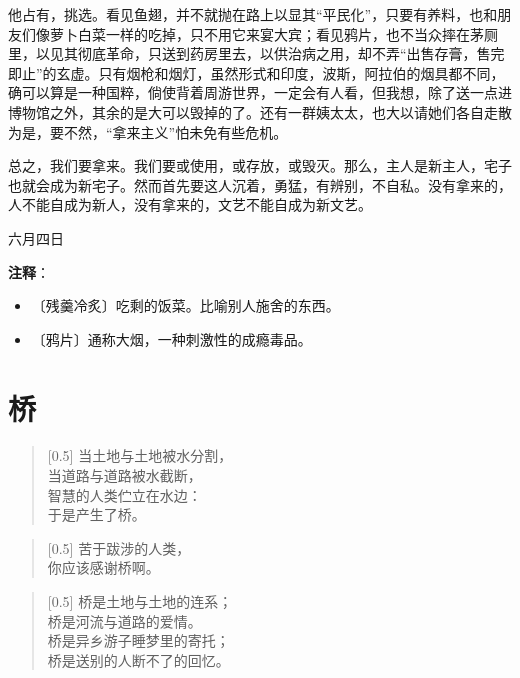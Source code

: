 \documentclass[12pt,UTF-8,openany]{ctexbook}
\begin{document}
\begin{normalsize}
    他占有，挑选。看见鱼翅，并不就抛在路上以显其“平民化”，只要有养料，也和朋友们像萝卜白菜一样的吃掉，只不用它来宴大宾；看见鸦片，也不当众摔在茅厕里，以见其彻底革命，只送到药房里去，以供治病之用，却不弄“出售存膏，售完即止”的玄虚。只有烟枪和烟灯，虽然形式和印度，波斯，阿拉伯的烟具都不同，确可以算是一种国粹，倘使背着周游世界，一定会有人看，但我想，除了送一点进博物馆之外，其余的是大可以毁掉的了。还有一群姨太太，也大以请她们各自走散为是，要不然，“拿来主义”怕未免有些危机。
    
    总之，我们要拿来。我们要或使用，或存放，或毁灭。那么，主人是新主人，宅子也就会成为新宅子。然而首先要这人沉着，勇猛，有辨别，不自私。没有拿来的，人不能自成为新人，没有拿来的，文艺不能自成为新文艺。
    
    \hfill 六月四日
    
\end{normalsize}


\newpage

\textbf{注释}：

\vspace{-1em}

\begin{itemize}
    \setlength\itemsep{-0.2em}
    \item 〔残羹冷炙〕吃剩的饭菜。比喻别人施舍的东西。
    \item 〔鸦片〕通称大烟，一种刺激性的成瘾毒品。
\end{itemize}

\chapter{桥}

\begin{normalsize}
    
    \begin{verse}[0.5\linewidth]
        当土地与土地被水分割， \\
        当道路与道路被水截断， \\
        智慧的人类伫立在水边： \\
        于是产生了桥。
    \end{verse}
    
    
    \begin{verse}[0.5\linewidth]
        苦于跋涉的人类， \\
        你应该感谢桥啊。
    \end{verse}
    
    
    \begin{verse}[0.5\linewidth]
        桥是土地与土地的连系； \\
        桥是河流与道路的爱情。 \\
        桥是异乡游子睡梦里的寄托； \\
        桥是送别的人断不了的回忆。
    \end{verse}
    
\end{normalsize}
\end{document}
